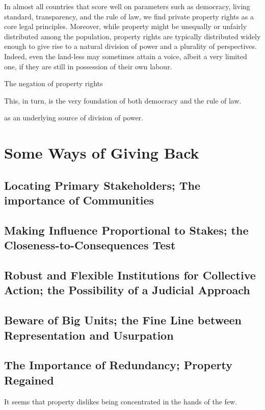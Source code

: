 In almost all countries that score well on parameters such as democracy, living standard, transparency, and the rule of law, we find private property rights as a core legal principles. Moreover, while property might be unequally or unfairly distributed among the population, property rights are typically distributed widely enough to give rise to a natural division of power and a plurality of perspectives. Indeed, even the land-less may sometimes attain a voice, albeit a very limited one, if they are still in possession of their own labour.

The negation of property rights

This, in turn, is the very foundation of both democracy and the rule of law.



 as an underlying source of division of power.


 
\section{Some Ways of Giving Back}

\subsection{Locating Primary Stakeholders; The importance of Communities}

\subsection{Making Influence Proportional to Stakes; the Closeness-to-Consequences Test}

\subsection{Robust and Flexible Institutions for Collective Action; the Possibility of a Judicial Approach}

\subsection{Beware of Big Units; the Fine Line between Representation and Usurpation}

\subsection{The Importance of Redundancy; Property Regained}

It seems that property dislikes being concentrated in the hands of the few. 
